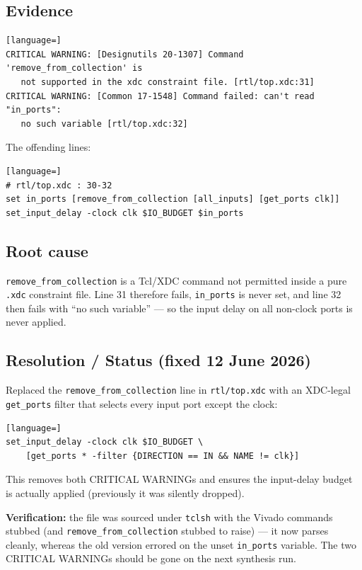 \documentclass[11pt,a4paper]{article}
\begin{document}
\subsection{Evidence}
\begin{lstlisting}[language=]
CRITICAL WARNING: [Designutils 20-1307] Command 'remove_from_collection' is
   not supported in the xdc constraint file. [rtl/top.xdc:31]
CRITICAL WARNING: [Common 17-1548] Command failed: can't read "in_ports":
   no such variable [rtl/top.xdc:32]
\end{lstlisting}
The offending lines:
\begin{lstlisting}[language=]
# rtl/top.xdc : 30-32
set in_ports [remove_from_collection [all_inputs] [get_ports clk]]
set_input_delay -clock clk $IO_BUDGET $in_ports
\end{lstlisting}

\subsection{Root cause}
\texttt{remove\_from\_collection} is a Tcl/XDC command not permitted inside a
pure \texttt{.xdc} constraint file. Line 31 therefore fails, \texttt{in\_ports}
is never set, and line 32 then fails with ``no such variable'' — so the input
delay on all non-clock ports is never applied.

\subsection{Resolution / Status \textnormal{(\textbf{fixed} 12 June 2026)}}
Replaced the \texttt{remove\_from\_collection} line in \texttt{rtl/top.xdc} with
an XDC-legal \texttt{get\_ports} filter that selects every input port except the
clock:
\begin{lstlisting}[language=]
set_input_delay -clock clk $IO_BUDGET \
    [get_ports * -filter {DIRECTION == IN && NAME != clk}]
\end{lstlisting}
This removes both CRITICAL WARNINGs and ensures the input-delay budget is
actually applied (previously it was silently dropped).

\textbf{Verification:} the file was sourced under \texttt{tclsh} with the Vivado
commands stubbed (and \texttt{remove\_from\_collection} stubbed to raise) — it
now parses cleanly, whereas the old version errored on the unset
\texttt{in\_ports} variable. The two CRITICAL WARNINGs should be gone on the
next synthesis run.

\end{document}
